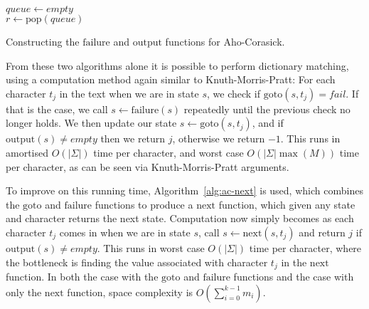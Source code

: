 \documentclass[ %
                    author={Dominic Joseph Moylett},
                supervisor={Dr. Raphael Clifford and Dr. Benjamin Sach},
                    degree={MEng},
                     title={Dictionary Matching with Fingerprints},
                  subtitle={An Empirical Analysis},
                      type={Research},
                      year={2014} ]{dissertation}
\begin{document}
\begin{algorithm}[t]
$queue \gets empty$\\
 {
  $r \gets \text{pop}(queue)$\\
}
\caption{Constructing the $\text{failure}$ and $\text{output}$ functions for Aho-Corasick.}
\label{alg:ac-failure}
\end{algorithm}

From these two algorithms alone it is possible to perform dictionary matching, using a computation method again similar to Knuth-Morris-Pratt: For each character $t_j$ in the text when we are in state $s$, we check if $\text{goto}(s, t_j) = fail$. If that is the case, we call $s \gets \text{failure}(s)$ repeatedly until the previous check no longer holds. We then update our state $s \gets \text{goto}(s, t_j)$, and if $\text{output}(s) \neq empty$ then we return $j$, otherwise we return $-1$. This runs in amortised $O(|\Sigma|)$ time per character, and worst case $O(|\Sigma|\max(M))$ time per character, as can be seen via Knuth-Morris-Pratt arguments.

To improve on this running time, Algorithm~\ref{alg:ac-next} is used, which combines the $\text{goto}$ and $\text{failure}$ functions to produce a $\text{next}$ function, which given any state and character returns the next state. Computation now simply becomes as each character $t_j$ comes in when we are in state $s$, call $s \gets \text{next}(s, t_j)$ and return $j$ if $\text{output}(s) \neq empty$. This runs in worst case $O(|\Sigma|)$ time per character, where the bottleneck is finding the value associated with character $t_j$ in the $\text{next}$ function. In both the case with the $\text{goto}$ and $\text{failure}$ functions and the case with only the $\text{next}$ function, space complexity is $O(\sum_{i=0}^{k-1}m_i)$.
\end{document}
